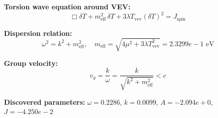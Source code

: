 
\textbf{Torsion wave equation around VEV:}
\begin{equation}
  \Box \delta T + m_{\text{eff}}^2 \, \delta T + 3\lambda T_{\text{vev}} (\delta T)^2 = J_{\text{spin}}
\end{equation}

\textbf{Dispersion relation:}
\begin{equation}
  \omega^2 = k^2 + m_{\text{eff}}^2, \quad
  m_{\text{eff}} = \sqrt{4\mu^2 + 3\lambda T_{\text{vev}}^2} = 2.3299e-1 \text{ eV}
\end{equation}

\textbf{Group velocity:}
\begin{equation}
  v_g = \frac{k}{\omega} = \frac{k}{\sqrt{k^2 + m_{\text{eff}}^2}} < c
\end{equation}

\textbf{Discovered parameters:}
$\omega = 0.2286$, \quad
$k = 0.0099$, \quad
$A = -2.094e+0$, \quad
$J = -4.250e-2$
